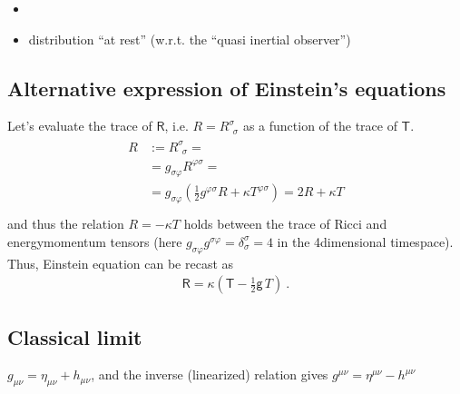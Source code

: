 \documentclass[letterpaper,10pt,english]{jupyterBook}
\begin{document}
\begin{enumerate}
\begin{itemize}
\item {} 
\sphinxAtStartPar
{}

\item {} 
\sphinxAtStartPar
{} distribution “at rest” (w.r.t. the “quasi inertial observer”)

\end{itemize}

\end{enumerate}


\subsection{Alternative expression of Einstein’s equations}
\label{\detokenize{ch/relativity-general/einstein-equation:alternative-expression-of-einstein-s-equations}}\label{\detokenize{ch/relativity-general/einstein-equation:relativity-general-notes-einstein-equation-alternative}}
\sphinxAtStartPar
Let’s evaluate the trace of \(\mathsf{R}\), i.e. \(R = R^{\sigma}_{\ \ \sigma}\) as a function of the trace of \(\mathsf{T}\).
\begin{equation*}
\begin{split}\begin{aligned}
  R
  & := R^{\sigma}_{\ \ \sigma} = \\
  & = g_{\sigma \varphi} R^{\varphi \sigma} = \\
  & = g_{\sigma \varphi} \left( \frac{1}{2} g^{\varphi \sigma} R + \kappa T^{\varphi \sigma} \right) = 2 R + \kappa T \\
\end{aligned}\end{split}
\end{equation*}
\sphinxAtStartPar
and thus the relation \(R = - \kappa T\) holds between the trace of Ricci and energy\sphinxhyphen{}momentum tensors (here \(g_{\sigma \varphi} g^{\sigma \varphi} = \delta_{\sigma}^{\sigma} = 4\) in the 4\sphinxhyphen{}dimensional time\sphinxhyphen{}space). Thus, Einstein equation can be recast as
\begin{equation}\label{equation:ch/relativity-general/einstein-equation:eq:einstein:alternative}
\begin{split}\mathsf{R} = \kappa \left( \mathsf{T} - \frac{1}{2} \mathsf{g} \, T \right) \ .\end{split}
\end{equation}

\subsection{Classical limit}
\label{\detokenize{ch/relativity-general/einstein-equation:classical-limit}}\label{\detokenize{ch/relativity-general/einstein-equation:relativity-general-notes-einstein-equation-classical-limit}}
\sphinxAtStartPar
{} \(g_{\mu \nu} = \eta_{\mu \nu} + h_{\mu \nu}\), and the inverse (linearized) relation gives \(g^{\mu \nu} = \eta^{\mu \nu} - h^{\mu \nu}\)
\end{document}
